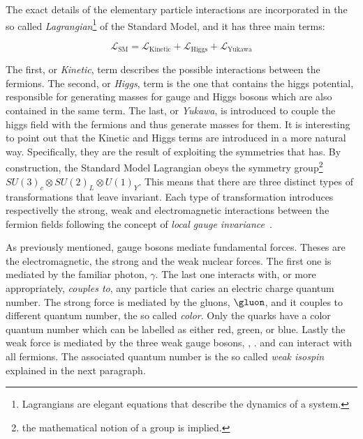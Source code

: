 The exact details of the elementary particle interactions are incorporated in the so called
{\it Lagrangian}\footnote{ Lagrangians are elegant equations that describe the dynamics of a system.} of the Standard Model,
and it has three main terms:

\begin{equation}
\mathscr{L}_{\text{SM}} =
\mathscr{L}_{\text{Kinetic}} + \mathscr{L}_{\text{Higgs}} + \mathscr{L}_{\text{Yukawa}}
\label{lagrangian}
\end{equation}

\noindent The first, or {\it Kinetic}, term describes the possible interactions between the fermions.
The second, or {\it Higgs}, term is the one that contains the higgs potential, responsible for generating
masses for gauge and Higgs bosons which are also contained in the same term.
The last, or {\it Yukawa}, is introduced to couple the higgs field with the fermions and thus generate masses for them.
It is interesting to point out that the Kinetic and Higgs terms are introduced in a more natural way.
Specifically, they are the result of exploiting the symmetries that  has.
By construction, the Standard Model Lagrangian obeys the symmetry group\footnote{the mathematical notion of a group is implied.}
$SU(3)_c\otimes SU(2)_L\otimes U(1)_Y$. This means that there are three distinct types of transformations
that leave  invariant. Each type of transformation introduces respectivelly the strong,
weak and electromagnetic interactions between the fermion fields following the concept of {\it local gauge invariance}~\cite{aitchison}.

As previously mentioned, gauge bosons mediate fundamental forces. Theses are the electromagnetic, the strong and the weak nuclear forces.
The first one is mediated by the familiar photon, $\gamma$. The last one interacts with, or more appropriately, {\it couples to}, any particle that
caries an electric charge quantum number. The strong force is mediated by the gluons, $\gluon$, and it couples to different quantum number,
the so called {\it color}. Only the quarks have a color quantum number which can be labelled as either red, green, or blue. Lastly the
weak force is mediated by the three weak gauge bosons, \Wpm, \Z. and can interact with all fermions. The associated quantum number is
the so called {\it weak isospin} explained in the next paragraph.

